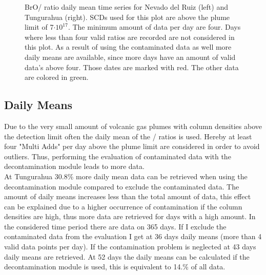 \documentclass  [
  paper    = a4,
  BCOR     = 10mm,
  twoside,
  fontsize = 12pt,
  fleqn,
  toc      = bibnumbered,
  toc      = listofnumbered,
  numbers  = noendperiod,
  headings = normal,
  listof   = leveldown,
  version  = 3.03
]                                       {scrreprt}
\begin{document}
	\begin{figure}
		\caption{
			BrO/ ratio daily mean time series for Nevado del Ruiz (left) and Tungurahua (right).  SCDs used for this plot are above the plume limit of 7$\cdot 10^{17}$. The minimum amount of data per day are four. Days where less than four valid ratios are recorded are not considered in this plot. As a result of using the contaminated data as well more daily means are available, since more days have an amount of valid data's above four. Those dates are marked with red. The other data are colored in green.}
		\label{fig:dailymeanstungurahua}
	\end{figure}
	\subsection*{Daily Means}
	
	 Due to the very small amount of volcanic gas plumes with 
	  column densities above the detection limit often the daily mean of the /  ratios is used. Hereby at least four "Multi Adds" per day above the plume limit are considered in order to avoid outliers. Thus, performing the evaluation of contaminated data with the decontamination module leads to more data.\\

	At Tungurahua 30.8\% more daily mean data can be retrieved when using the decontamination module compared to exclude the contaminated data. The amount of daily means increases less than the total amount of data, this effect can be explained due to a higher occurrence of contamination if the   column densities are high, thus more data are retrieved for days with a high   amount.
	In the considered time period there are data on 365 days. 
	If I exclude the contaminated data from the evaluation I get at 36 days daily means (more than 4 valid data points per day). If the contamination problem is neglected at 43 days daily means are retrieved. At 52 days the daily means can be calculated if the decontamination module is used, this is equivalent to 14.\% of all data.\\
\end{document}
